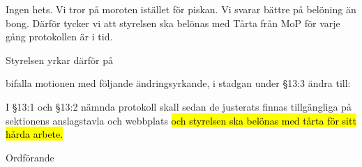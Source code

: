 \documentclass[../_main/handlingar.tex]{subfiles}
\begin{document}
\motionssvar
Ingen hets. Vi tror på moroten istället för piskan. Vi svarar bättre på belöning än bong. Därför tycker vi att styrelsen ska belönas med Tårta från MoP för varje gång protokollen är i tid.

Styrelsen yrkar därför på

\begin{attsatser}
	\att bifalla motionen med följande ändringsyrkande,
	\att i stadgan under \S13:3 ändra till:\par
	I \S13:1 och \S13:2 nämnda protokoll skall sedan de justerats finnas
	tillgängliga på sektionens anslagstavla och webbplats \hl{och styrelsen ska belönas med tårta för sitt hårda arbete.}
	
	\changenote	
\end{attsatser}


\begin{signatures}{1}
	\ist
	\signature{Daniel Bakic}{Ordförande}
\end{signatures}
\end{document}
